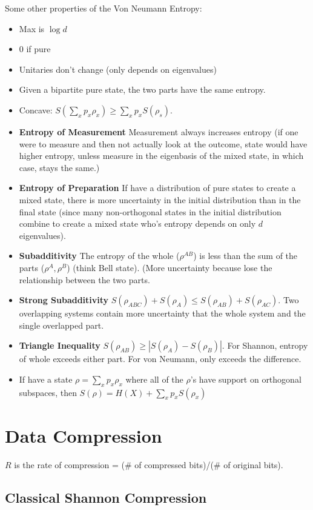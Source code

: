 \documentclass[12pt]{article}
\begin{document}
Some other properties of the Von Neumann Entropy:
\begin{itemize}
\item Max is $\log d$
\item 0 if pure
\item Unitaries don't change (only depends on eigenvalues)
\item Given a bipartite pure state, the two parts have the same entropy.
\item Concave: $S(\sum_xp_x\rho_x)\geq\sum_xp_xS(\rho_s)$.
\item {\bf{Entropy of Measurement}} Measurement always increases entropy (if one were to measure and then not actually look at the outcome,
state would have higher entropy, unless measure in the eigenbasis of the mixed state, in which case, stays the same.)
\item {\bf{Entropy of Preparation}} If have a distribution of pure states to create a mixed state, there is more uncertainty in the initial distribution than in the final state (since many non-orthogonal states in the initial distribution combine to create a mixed state who's entropy depends on only $d$ eigenvalues).
\item {\bf{Subadditivity}} The entropy of the whole ($\rho^{AB}$) is less than the sum of the parts ($\rho^A,\rho^B$) (think Bell state). (More uncertainty because lose the relationship between the two parts.
\item  {\bf{ Strong Subadditivity}} $S(\rho_{ABC})+S(\rho_A)\leq S(\rho_{AB})+S(\rho_{AC})$. Two overlapping systems contain more uncertainty that the whole system and the single overlapped part.
\item {\bf{Triangle Inequality}} $S(\rho_{AB})\geq|S(\rho_A)-S(\rho_B)|$. For Shannon, entropy of whole exceeds either part. For von Neumann, only exceeds the difference.
\item If have a state $\rho=\sum_xp_x\rho_x$ where all of the $\rho$'s have support on orthogonal subspaces, then 
$S(\rho)=H(X)+\sum_xp_xS(\rho_x)$
\end{itemize}



\section{Data Compression}

$R$ is the rate of compression = (\# of compressed bits)/(\# of original bits).
\subsection{Classical Shannon Compression}
\end{document}
